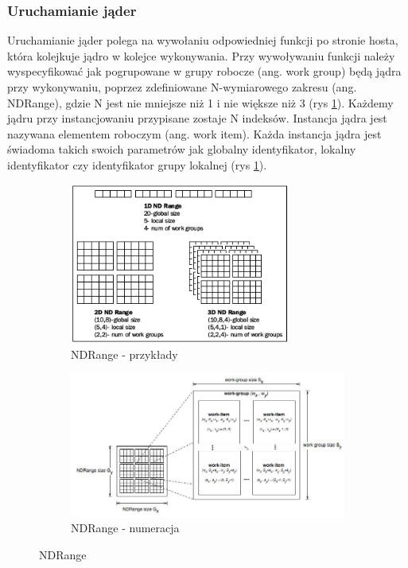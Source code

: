 \documentclass[polish, 12pt]{aghthesis}
\begin{document}
	\subsubsection{Uruchamianie jąder}
	Uruchamianie jąder polega na wywołaniu odpowiedniej funkcji po stronie hosta, która kolejkuje jądro w kolejce wykonywania. Przy wywoływaniu funkcji należy wyspecyfikować jak pogrupowane w grupy robocze (ang. work group) będą jądra przy wykonywaniu, poprzez zdefiniowane N-wymiarowego zakresu (ang. NDRange), gdzie N jest nie mniejsze niż 1 i nie większe niż 3 (rys \ref{fig:ndrange_examples}). Każdemy jądru przy instancjowaniu przypisane zostaje N indeksów. Instancja jądra jest nazywana elementem roboczym (ang. work item). Każda instancja jądra jest świadoma takich swoich parametrów jak globalny identyfikator, lokalny identyfikator czy identyfikator grupy lokalnej (rys \ref{fig:ndrange_examples}).
	
	
	\begin{figure}
	\centering
		\begin{subfigure}[b]{\textwidth}
			\centering
			\includegraphics[width=0.8\textwidth]{ndrange.png}
			\caption{NDRange - przykłady}
			\label{fig:ndrange_examples}
		\end{subfigure}
		\begin{subfigure}[b]{\textwidth}
			\centering
			\includegraphics[width=\textwidth]{ndrange2.jpg}
			\caption{NDRange - numeracja}
			\label{fig:ndrange_numbering}
		\end{subfigure}
		\caption{NDRange}
	\end{figure}
	
\end{document}
